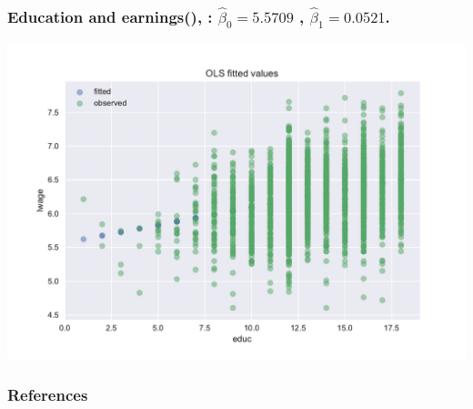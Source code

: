 \begin{frame}\frametitle{Education and earnings(\cite{card1993}), : $\hat{\beta}_0 =  5.5709$ ,
    $\hat{\beta}_1 = 0.0521$. }

  \includegraphics[width=\figwidth,height=\figheight]{lreg_CardEducWage}   

\end{frame}


\begin{frame}[allowframebreaks]
  \frametitle{References}
 

\end{frame}


